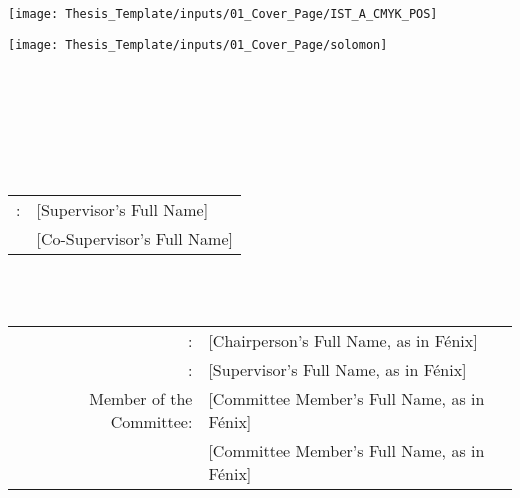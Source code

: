 

\thispagestyle{empty}

\texttt{[image: Thesis\_Template/inputs/01\_Cover\_Page/IST\_A\_CMYK\_POS]}

\begin{center}


\vspace{.05\textheight}
\begin{center}
\texttt{[image: Thesis\_Template/inputs/01\_Cover\_Page/solomon]}
\end{center}
\vspace{.025\textheight}



\vspace{1.0cm}
{} \\ 
\vspace{0.2cm}
{} \\
\vspace{0.9cm}

\vspace{0.6cm}
{} \\ 

\vspace{2.0cm}
{\FontSn \coverThesis} \\
\vspace{0.3cm}
{}  \\

\vspace{1.0cm}
{\FontSn %
\begin{tabular}{ll}
	\coverSupervisors: & [Supervisor's Full Name] \\
	                   & [Co-Supervisor's Full Name]
\end{tabular} } \\

\vspace{1.0cm}
{\FontMb \coverExaminationCommittee} \\
\vspace{0.3cm}
{\FontSn %
\begin{tabular}{rl}
	  \coverChairperson:    & [Chairperson's Full Name, as in Fénix]  \\
	  \coverSupervisor:     & [Supervisor's Full Name, as in Fénix]   \\
	Member of the Committee:	& [Committee Member's Full Name, as in Fénix] \\
								& [Committee Member's Full Name, as in Fénix]
\end{tabular} } \\

\vspace{1.5cm}
{} \\ 


\end{center}
